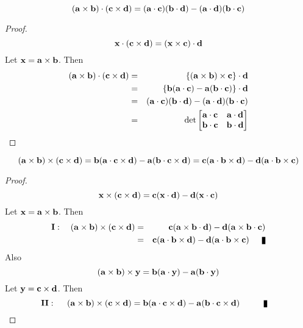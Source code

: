 \begin{theorem}
\[ ({\bf a} \times {\bf b}) \cdot ({\bf c} \times {\bf d}) = ({\bf a}\cdot {\bf c})({\bf b}\cdot {\bf d}) - ({\bf a}\cdot {\bf d})({\bf b}\cdot {\bf c}) \]
\end{theorem}
\begin{proof}
\[ {\bf x}\cdot ({\bf c}\times{\bf d}) = ({\bf x}\times {\bf c})\cdot{\bf d}\] Let ${\bf x} = {\bf a}\times{\bf b}$. Then 
\begin{eqnarray*}
({\bf a} \times {\bf b}) \cdot ({\bf c} \times {\bf d}) &=&\{({\bf a} \times {\bf b})  \times {\bf c}\} \cdot {\bf d} \\
&=& \{{\bf b}({\bf a}\cdot {\bf c}) - {\bf a}({\bf b}\cdot {\bf c}) \}\cdot {\bf d} \\
&=& ({\bf a}\cdot {\bf c})({\bf b}\cdot {\bf d}) - ({\bf a}\cdot {\bf d})({\bf b}\cdot {\bf c}) \\
&=&\det\begin{bmatrix}
{\bf a}\cdot {\bf c} & {\bf a}\cdot {\bf d} \\
{\bf b}\cdot {\bf c} & {\bf b}\cdot {\bf d}
\end{bmatrix}
\end{eqnarray*} 
\end{proof}

\begin{theorem}
\[ ({\bf a} \times {\bf b}) \times ({\bf c} \times {\bf d}) = {\bf b}({\bf a}\cdot {\bf c}\times {\bf d}) - {\bf a}({\bf b}\cdot {\bf c}\times {\bf d}) =  {\bf c}({\bf a}\cdot {\bf b}\times {\bf d}) - {\bf d}({\bf a}\cdot {\bf b}\times {\bf c})\]
\end{theorem}
\begin{proof}
\[ {\bf x} \times ({\bf c} \times {\bf d}) = {\bf c}({\bf x}\cdot {\bf d}) - {\bf d}({\bf x}\cdot {\bf c}) \] Let ${\bf x} = {\bf a}\times {\bf b}$. Then 
\begin{eqnarray*}
{\bf I}: ~~~({\bf a} \times {\bf b}) \times ({\bf c} \times {\bf d}) &=& {\bf c}({\bf a}\times {\bf b}\cdot {\bf d}) - {\bf d}({\bf a}\times {\bf b}\cdot {\bf c}) \\ 
 &=& {\bf c}({\bf a}\cdot {\bf b}\times {\bf d}) - {\bf d}({\bf a}\cdot {\bf b}\times{\bf c})\qed
\end{eqnarray*}
Also 
\[ ({\bf a} \times {\bf b}) \times {\bf y}  = {\bf b}({\bf a}\cdot {\bf y}) - {\bf a}({\bf b}\cdot {\bf y}) \] Let ${\bf y} = {\bf c}\times {\bf d}$. Then 
\[ {\bf II}:~~~~ ({\bf a} \times {\bf b}) \times ({\bf c} \times {\bf d}) ={\bf b}({\bf a}\cdot {\bf c}\times{\bf d}) - {\bf a}({\bf b}\cdot {\bf c}\times{\bf d})~~~~\qed~~~\]
\end{proof}


